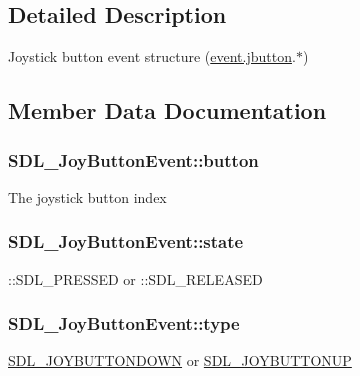 \subsection{Detailed Description}
Joystick button event structure (\hyperlink{union_s_d_l___event_a591104d64903ae1cf70874fb5d3124ff}{event.\+jbutton}.$\ast$) 

\subsection{Member Data Documentation}
\hypertarget{struct_s_d_l___joy_button_event_a73ebe4261cf80564052af9c1af737a4d}{}
\subsubsection[{button}]{ S\+D\+L\+\_\+\+Joy\+Button\+Event\+::button}\label{struct_s_d_l___joy_button_event_a73ebe4261cf80564052af9c1af737a4d}
The joystick button index \hypertarget{struct_s_d_l___joy_button_event_ad3b6f8d9aa2c5e694f664b97d12bcd2b}{}
\subsubsection[{state}]{ S\+D\+L\+\_\+\+Joy\+Button\+Event\+::state}\label{struct_s_d_l___joy_button_event_ad3b6f8d9aa2c5e694f664b97d12bcd2b}
\+::\+S\+D\+L\+\_\+\+P\+R\+E\+S\+S\+E\+D or \+::\+S\+D\+L\+\_\+\+R\+E\+L\+E\+A\+S\+E\+D \hypertarget{struct_s_d_l___joy_button_event_a8f3312a046d37fa2884b93f69c4cb655}{}
\subsubsection[{type}]{ S\+D\+L\+\_\+\+Joy\+Button\+Event\+::type}\label{struct_s_d_l___joy_button_event_a8f3312a046d37fa2884b93f69c4cb655}
\hyperlink{_s_d_l__events_8h_a3b589e89be6b35c02e0dd34a55f3fccaa386ac978bc145a45883fe0adab70710b}{S\+D\+L\+\_\+\+J\+O\+Y\+B\+U\+T\+T\+O\+N\+D\+O\+W\+N} or \hyperlink{_s_d_l__events_8h_a3b589e89be6b35c02e0dd34a55f3fccaa76f91c81110f012e3a47cbbc0449e3c3}{S\+D\+L\+\_\+\+J\+O\+Y\+B\+U\+T\+T\+O\+N\+U\+P} \hypertarget{struct_s_d_l___joy_button_event_a1679049adad7242b28420948fdc79044}{}
